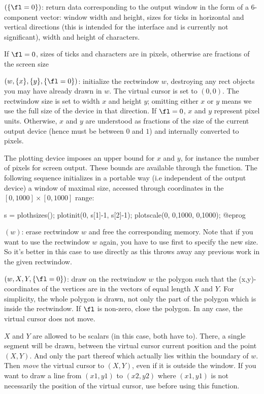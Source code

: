 $(\{\fl=0\})$: \label{se:plothsizes}return data corresponding to the output window
in the form of a 6-component vector: window width and height, sizes for ticks
in horizontal and vertical directions (this is intended for the 
interface and is currently not significant), width and height of characters.

If $\fl = 0$, sizes of ticks and characters are in
pixels, otherwise are fractions of the screen size

$(w,\{x\},\{y\},\{\fl=0\})$: \label{se:plotinit}initialize the rectwindow $w$,
destroying any rect objects you may have already drawn in $w$. The virtual
cursor is set to $(0,0)$. The rectwindow size is set to width $x$ and height
$y$; omitting either $x$ or $y$ means we use the full size of the device
in that direction.
If $\fl=0$, $x$ and $y$ represent pixel units. Otherwise, $x$ and $y$
are understood as fractions of the size of the current output device (hence
must be between $0$ and $1$) and internally converted to pixels.

The plotting device imposes an upper bound for $x$ and $y$, for instance the
number of pixels for screen output. These bounds are available through the
 function. The following sequence initializes in a portable
way (i.e independent of the output device) a window of maximal size, accessed
through coordinates in the $[0,1000] \times [0,1000]$ range:

\bprog
s = plothsizes();
plotinit(0, s[1]-1, s[2]-1);
plotscale(0, 0,1000, 0,1000);
@eprog

$(w)$: \label{se:plotkill}erase rectwindow $w$ and free the corresponding memory. Note that if you
want to use the rectwindow $w$ again, you have to use  first
to specify the new size. So it's better in this case to use 
directly as this throws away any previous work in the given rectwindow.

$(w,X,Y,\{\fl=0\})$: \label{se:plotlines}draw on the rectwindow $w$
the polygon such that the (x,y)-coordinates of the vertices are in the
vectors of equal length $X$ and $Y$. For simplicity, the whole
polygon is drawn, not only the part of the polygon which is inside the
rectwindow. If $\fl$ is non-zero, close the polygon. In any case, the
virtual cursor does not move.

$X$ and $Y$ are allowed to be scalars (in this case, both have to).
There, a single segment will be drawn, between the virtual cursor current
position and the point $(X,Y)$. And only the part thereof which
actually lies within the boundary of $w$. Then \emph{move} the virtual cursor
to $(X,Y)$, even if it is outside the window. If you want to draw a
line from $(x1,y1)$ to $(x2,y2)$ where $(x1,y1)$ is not necessarily the
position of the virtual cursor, use  before using this
function.

